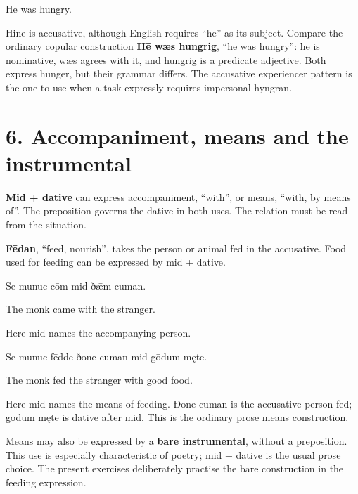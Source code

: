 He was hungry.

Hine is accusative, although English requires “he” as its subject. Compare the ordinary copular construction \textbf{Hē wæs hungrig}, “he was hungry”: hē is nominative, wæs agrees with it, and hungrig is a predicate adjective. Both express hunger, but their grammar differs. The accusative experiencer pattern is the one to use when a task expressly requires impersonal hyngran.

\section*{6. Accompaniment, means and the instrumental}

\textbf{Mid + dative} can express accompaniment, “with”, or means, “with, by means of”. The preposition governs the dative in both uses. The relation must be read from the situation.

\textbf{Fēdan}, “feed, nourish”, takes the person or animal fed in the accusative. Food used for feeding can be expressed by mid + dative.

Se munuc cōm mid ðǣm cuman.

The monk came with the stranger.

Here mid names the accompanying person.

Se munuc fēdde ðone cuman mid gōdum męte.

The monk fed the stranger with good food.

Here mid names the means of feeding. Ðone cuman is the accusative person fed; gōdum męte is dative after mid. This is the ordinary prose means construction.

Means may also be expressed by a \textbf{bare instrumental}, without a preposition. This use is especially characteristic of poetry; mid + dative is the usual prose choice. The present exercises deliberately practise the bare construction in the feeding expression.

